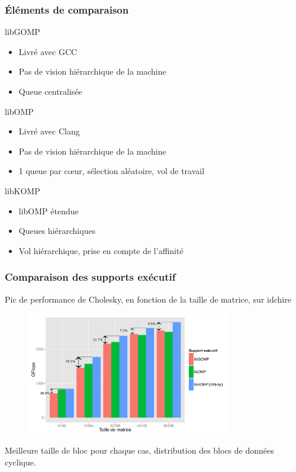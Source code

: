 \documentclass[xcolor={usenames,dvipsnames,svgnames,table}, aspectratio=43]{beamer}
\begin{document}
\begin{frame}
  \frametitle{Éléments de comparaison}

  \begin{block}{libGOMP}
    \begin{itemize}
      \item Livré avec GCC
      \item Pas de vision hiérarchique de la machine
      \item Queue centralisée
    \end{itemize}
  \end{block}

  \begin{block}{libOMP}
    \begin{itemize}
      \item Livré avec Clang
      \item Pas de vision hiérarchique de la machine
      \item 1 queue par cœur, sélection aléatoire, vol de travail
    \end{itemize}
  \end{block}

  \begin{block}{libKOMP}
    \begin{itemize}
      \item libOMP étendue
      \item Queues hiérarchiques
      \item Vol hiérarchique, prise en compte de l'affinité
    \end{itemize}
  \end{block}

\end{frame}




\begin{frame}
  \frametitle{Comparaison des supports exécutif}
  Pic de performance de Cholesky, en fonction de la taille de matrice, sur idchire
  \begin{figure}
    \centering
    \includegraphics[width=0.8\textwidth]{graph/graph_details_cholesky_idchire.pdf}
  \end{figure}
  Meilleure taille de bloc pour chaque cas, distribution des blocs de données cyclique.
\end{frame}
\end{document}
